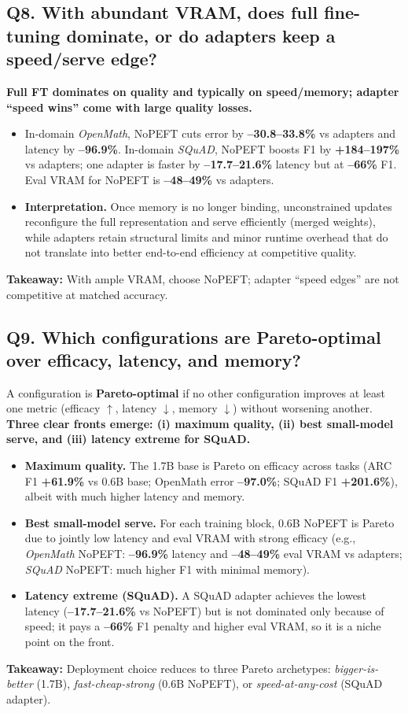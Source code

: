 \documentclass[11pt,a4paper]{article}
\begin{document}
\subsection*{Q8. With abundant VRAM, does full fine-tuning dominate, or do adapters keep a speed/serve edge?}
\textbf{Full FT dominates on quality and typically on speed/memory; adapter “speed wins” come with large quality losses.}
\begin{itemize}
  \item In-domain \textit{OpenMath}, NoPEFT cuts error by \textbf{--30.8--33.8\%} vs adapters and latency by \textbf{--96.9\%}. In-domain \textit{SQuAD}, NoPEFT boosts F1 by \textbf{+184--197\%} vs adapters; one adapter is faster by \textbf{--17.7--21.6\%} latency but at \textbf{--66\%} F1. Eval VRAM for NoPEFT is \textbf{--48--49\%} vs adapters.
  \item \textbf{Interpretation.} Once memory is no longer binding, unconstrained updates reconfigure the full representation and serve efficiently (merged weights), while adapters retain structural limits and minor runtime overhead that do not translate into better end-to-end efficiency at competitive quality.
\end{itemize}
\textbf{Takeaway:} With ample VRAM, choose NoPEFT; adapter “speed edges” are not competitive at matched accuracy.

\subsection*{Q9. Which configurations are Pareto-optimal over efficacy, latency, and memory?}
A configuration is \textbf{Pareto-optimal} if no other configuration improves at least one metric (efficacy $\uparrow$, latency $\downarrow$, memory $\downarrow$) without worsening another.
\textbf{Three clear fronts emerge: (i) maximum quality, (ii) best small-model serve, and (iii) latency extreme for SQuAD.}
\begin{itemize}
  \item \textbf{Maximum quality.} The 1.7B base is Pareto on efficacy across tasks (ARC F1 \textbf{+61.9\%} vs 0.6B base; OpenMath error \textbf{--97.0\%}; SQuAD F1 \textbf{+201.6\%}), albeit with much higher latency and memory.
  \item \textbf{Best small-model serve.} For each training block, 0.6B NoPEFT is Pareto due to jointly low latency and eval VRAM with strong efficacy (e.g., \textit{OpenMath} NoPEFT: \textbf{--96.9\%} latency and \textbf{--48--49\%} eval VRAM vs adapters; \textit{SQuAD} NoPEFT: much higher F1 with minimal memory).
  \item \textbf{Latency extreme (SQuAD).} A SQuAD adapter achieves the lowest latency (\textbf{--17.7--21.6\%} vs NoPEFT) but is not dominated only because of speed; it pays a \textbf{--66\%} F1 penalty and higher eval VRAM, so it is a niche point on the front.
\end{itemize}
\textbf{Takeaway:} Deployment choice reduces to three Pareto archetypes: \emph{bigger-is-better} (1.7B), \emph{fast-cheap-strong} (0.6B NoPEFT), or \emph{speed-at-any-cost} (SQuAD adapter).
\end{document}

